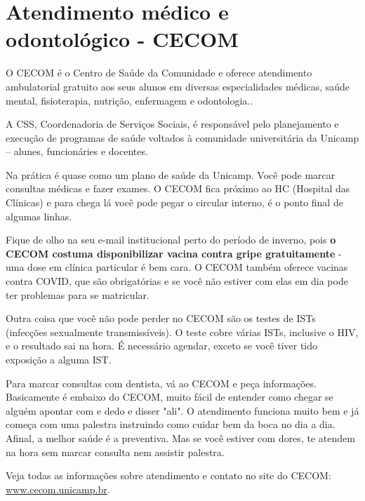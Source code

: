 \section{Atendimento médico e odontológico - CECOM}

O CECOM é o Centro de Saúde da Comunidade e oferece atendimento ambulatorial
gratuito aos seus alunos em diversas especialidades médicas, saúde mental, fisioterapia,
nutrição, enfermagem e odontologia..

A CSS, Coordenadoria de Serviços Sociais, é responsável pelo planejamento e
execução de programas de saúde voltados à comunidade universitária da Unicamp –
alunes, funcionáries e docentes.

Na prática é quase como um plano de saúde da Unicamp. Você pode marcar
consultas médicas e fazer exames. O CECOM fica próximo ao HC (Hospital das Clínicas)
e para chega lá você pode pegar o circular interno, é o ponto final de algumas linhas.

Fique de olho na seu e-mail institucional perto do período de inverno, pois \textbf{o CECOM
costuma disponibilizar vacina contra gripe gratuitamente} - uma dose em clínica
particular é bem cara. O CECOM também oferece vacinas contra COVID, que são
obrigatórias e se você não estiver com elas em dia pode ter problemas para se
matricular.

Outra coisa que você não pode perder no CECOM são os testes de ISTs (infecções
sexualmente transmissíveis). O teste cobre várias ISTs, inclusive o HIV, e o resultado sai
na hora. É necessário agendar, exceto se você tiver tido exposição a alguma IST.

Para marcar consultas com dentista, vá ao CECOM e peça informações. Basicamente é
embaixo do CECOM, muito fácil de entender como chegar se alguém apontar com e
dedo e disser "ali". O atendimento funciona muito bem e já começa com uma palestra
instruindo como cuidar bem da boca no dia a dia. Afinal, a melhor saúde é a preventiva.
Mas se você estiver com dores, te atendem na hora sem marcar consulta nem assistir
palestra.

Veja todas as informações sobre atendimento e contato no site do CECOM:
\url{www.cecom.unicamp.br}.